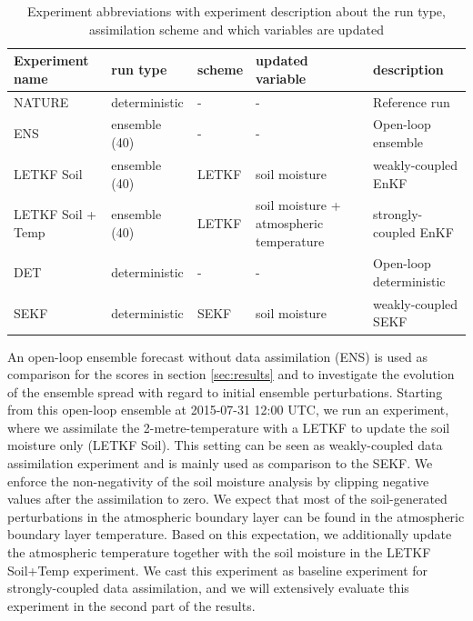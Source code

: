 \documentclass[hess, manuscript]{copernicus}
\begin{document}
\begin{table}[ht]
	\caption{
		Experiment abbreviations with experiment description about the run type, assimilation scheme and which variables are updated\label{tab:exp_desc}
	}
	\begin{tabular}{l|l|l|l|l}
		Experiment name & run type & scheme & updated variable & description\\
		\hline
		NATURE & deterministic & - & - & Reference run\\
		ENS & ensemble (40) & - & - & Open-loop ensemble\\
		LETKF Soil & ensemble (40) & LETKF & soil moisture & weakly-coupled EnKF\\
		LETKF Soil + Temp & ensemble (40) & LETKF & soil moisture + atmospheric temperature & strongly-coupled EnKF\\
		DET & deterministic & - & - & Open-loop deterministic\\
		SEKF & deterministic & SEKF & soil moisture & weakly-coupled SEKF
	\end{tabular}
\end{table}

An open-loop ensemble forecast without data assimilation (ENS) is used as comparison for the scores in section \ref{sec:results} and to investigate the evolution of the ensemble spread with regard to initial ensemble perturbations.
Starting from this open-loop ensemble at 2015-07-31 12:00 UTC, we run an experiment, where we assimilate the 2-metre-temperature with a LETKF to update the soil moisture only (LETKF Soil).
This setting can be seen as weakly-coupled data assimilation experiment and is mainly used as comparison to the SEKF.
We enforce the non-negativity of the soil moisture analysis by clipping negative values after the assimilation to zero.
We expect that most of the soil-generated perturbations in the atmospheric boundary layer can be found in the atmospheric boundary layer temperature.
Based on this expectation, we additionally update the atmospheric temperature together with the soil moisture in the LETKF Soil+Temp experiment.
We cast this experiment as baseline experiment for strongly-coupled data assimilation, and we will extensively evaluate this experiment in the second part of the results.
\end{document}
